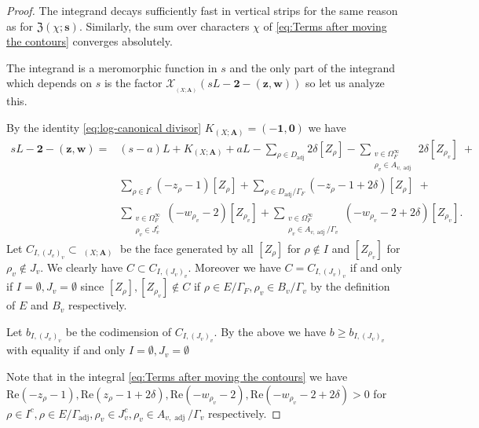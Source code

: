 \documentclass[a4paper,11pt,reqno]{amsart}
\DeclareMathOperator{\Eff}{\overline{Eff}}
\DeclareMathOperator{\adj}{adj}
\renewcommand{\Re}{\mathrm{Re}}
\theoremstyle{definition}
\begin{document}
\begin{proof}
	The integrand decays sufficiently fast in vertical strips for the same reason as for $\mathfrak{Z}(\chi ; \bm{s})$. Similarly, the sum over characters $\chi$ of \eqref{eq:Terms after moving the contours} converges absolutely.
	
	The integrand is a meromorphic function in $s$ and the only part of the integrand which depends on $s$ is the factor $\mathcal{X}_{\Eff_{(X; \mathbf{A})}}(s L - \mathbf{2} - (\bm{z}, \bm{w}))$ so let us analyze this.
	
	By the identity \eqref{eq:log-canonical divisor} $K_{(X ; \mathbf{A})} = (-\mathbf{1}, \mathbf{0})$ we have 
	\begin{equation*}
		\begin{split}
			s L - \mathbf{2} - (\bm{z}, \bm{w}) = &(s - a)L + K_{(X; \mathbf{A})} + aL - 
			\sum_{\rho \in D_{\adj}} 2\delta [Z_{\rho}] - 
			\sum_{\substack{v \in \Omega_{F}^{\infty} \\ \rho_v \in A_{v, \adj}}} 2\delta [Z_{\rho_v}] \; + \\
			&\sum_{\rho \in I^c} (- z_{\rho} - 1) [Z_{\rho}] + \sum_{\rho \in D_{\adj}/ \Gamma_{F}} (- z_{\rho} - 1 + 2 \delta) [Z_{\rho}] \; + \\
			&\sum_{\substack{v \in \Omega_{F}^{\infty} \\ \rho_v \in J_v^{c}}} ( - w_{\rho_v} - 2) [Z_{\rho_v}] + \sum_{\substack{v \in \Omega_{F}^{\infty} \\ \rho_v \in A_{v, \adj} / \Gamma_v}} ( - w_{\rho_v} - 2 + 2 \delta) [Z_{\rho_v}].
		\end{split}
	\end{equation*}
	Let $C_{I, (J_v)_v} \subset \Eff_{(X; \mathbf{A})}$ be the face generated by all $[Z_{\rho}]$ for $\rho \not \in I$ and $[Z_{\rho_v}]$ for $\rho_v \not \in J_v$. We clearly have $C \subset C_{I, (J_v)_v}$. Moreover we have $C = C_{I, (J_v)_v}$ if and only if $I = \emptyset, J_v = \emptyset$ since $[Z_{\rho}], [Z_{\rho_v}] \not \in C$ if $\rho \in E/\Gamma_F, \rho_v \in B_v / \Gamma_v$ by the definition of $E$ and $B_v$ respectively.
	
	Let $b_{I, (J_v)_v}$ be the codimension of $C_{I, (J_v)_v}$. By the above we have $b \geq b_{I, (J_v)_v}$ with equality if and only $I = \emptyset, J_v = \emptyset$
	
 	Note that in the integral \eqref{eq:Terms after moving the contours} we have $ \Re(- z_{\rho} - 1), \Re( z_{\rho} - 1 + 2 \delta), \Re( - w_{\rho_v} - 2), \Re( - w_{\rho_v} - 2 + 2 \delta) > 0$ for $\rho \in I^c, \rho \in E / \Gamma_{\adj}, \rho_v \in J_v^c, \rho_v \in A_{v, \adj} / \Gamma_v$ respectively. 
 	

\end{proof}
\end{document}
